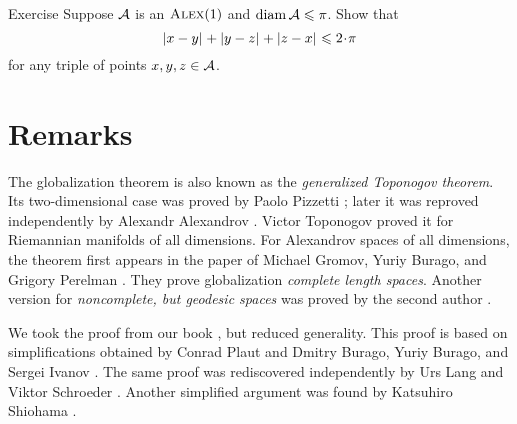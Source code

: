 \begin{thm}{Exercise}\label{ex:perim-k>0}
Suppose  
$\mathcal{A}$ is an $\textsc{Alex}(1)$
and $\operatorname{\rm diam}\nolimits \mathcal{A}\leqslant \pi$.
Show that 
\[\dist{x}{y}{}+\dist{y}{z}{}+\dist{z}{x}{}\le 2\cdot\pi\]
for any triple of points $x,y,z\in \mathcal{A}$.
\end{thm}


\section{Remarks}

The globalization theorem is also known as the \textit{generalized Toponogov theorem}.
Its two-dimensional case was proved by Paolo Pizzetti \cite{pizzetti};
later it was reproved independently by Alexandr Alexandrov \cite{alexandrov:devel}. %
Victor Toponogov \cite{toponogov-globalization+splitting} proved it for Riemannian manifolds of all dimensions.
For Alexandrov spaces of all dimensions, the theorem first appears in the paper of Michael Gromov, Yuriy Burago, and Grigory Perelman \cite{burago-gromov-perelman}.
They prove globalization \textit{complete length spaces}.
Another version for \textit{noncomplete, but geodesic spaces} was proved by the second author \cite{petrunin:globalization}.


We took the proof from our book \cite{alexander-kapovitch-petrunin2024}, but reduced generality.
This proof is based on simplifications obtained by Conrad Plaut \cite{plaut:dimension} and Dmitry Burago, Yuriy Burago, and Sergei Ivanov \cite{burago-burago-ivanov}.
The same proof was rediscovered independently by Urs Lang and Viktor Schroeder \cite{lang-schroeder:globalization}.
Another simplified argument was found by Katsuhiro Shiohama \cite{shiohama}.




